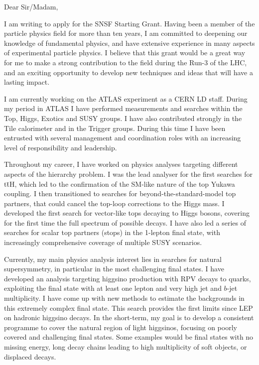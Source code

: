 \documentclass[11pt,a4paper,sans]{moderncv}        %
\begin{document}
\makecvtitle
\cvitem{}{
}
\vspace{1 cm}
Dear Sir/Madam,
\newline

I am writing to apply for the SNSF Starting Grant.
Having been a member of the particle physics field for more than ten years, I am committed to deepening our knowledge of fundamental physics, and have extensive experience in many aspects of experimental particle physics. I believe that this grant would be a great way for me to make a strong contribution to the field during the Run-3 of the LHC, and an exciting opportunity to develop new techniques and ideas that will have a lasting impact. 
\newline

I am currently working on the ATLAS experiment as a CERN LD staff. During my period in ATLAS I have performed measurements and searches within the Top, Higgs, Exotics and SUSY groups. I have also contributed strongly in the Tile calorimeter and in the Trigger groups. During this time I have been entrusted with several management and coordination roles with an increasing level of responsibility and leadership. 
\newline

Throughout my career, I have worked on physics analyses targeting different aspects of the hierarchy problem. I was the lead analyser for the first searches for t\=tH, which led to the confirmation of the SM-like nature of the top Yukawa coupling. I then transitioned to searches for beyond-the-standard-model top partners, that could cancel the top-loop corrections to the Higgs mass. I developed the first search for vector-like tops decaying to Higgs bosons, covering for the first time the full spectrum of possible decays. I have also led a series of searches for scalar top partners (stops) in the 1-lepton final state, with increasingly comprehensive coverage of multiple SUSY scenarios. 
\newline

Currently, my main physics analysis interest lies in searches for natural supersymmetry, in particular in the most challenging final states. I have developed an analysis targeting higgsino production with RPV decays to quarks, exploiting the final state with at least one lepton and very high jet and $b$-jet multiplicity. I have come up with new methods to estimate the backgrounds in this extremely complex final state. This search provides the first limits since LEP on hadronic higgsino decays. In the short-term, my goal is to develop a consistent programme to cover the natural region of light higgsinos, focusing on poorly covered and challenging final states. Some examples would be final states with no missing energy, long decay chains leading to high multiplicity of soft objects, or displaced decays.
\newline
\end{document}
